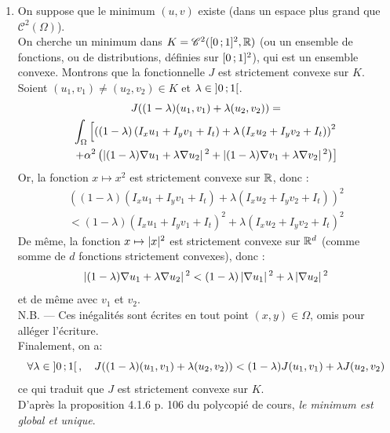 \begin{enumerate}[questions]
\item On suppose que le minimum $(u,v)$ existe (dans un espace plus grand que $\mathscr{C}^2(\Omega)$). \\
On cherche un minimum dans $K = \mathscr{C}^2(\interff{0}{1}^2, \reels)$ (ou un ensemble de fonctions, ou de distributions, définies sur $\interff{0}{1}^2$), qui est un ensemble convexe. Montrons que la fonctionnelle $J$ est strictement convexe sur $K$.\\
Soient $(u_1, v_1) \neq (u_2, v_2) \in K$ et $\lambda \in \interoo{0}{1}$.
\begin{multline*}
J((1-\lambda)(u_1, v_1) + \lambda(u_2, v_2)) = \\
\int_{\Omega} \left[ \left( \left(1-\lambda\right) \left( I_x u_1 + I_y v_1 + I_t \right) + \lambda \left( I_x u_2 + I_y v_2 + I_t \right) \right)^2 \right. \\
\left. + \alpha^2 \left( \abs{(1-\lambda)\nabla u_1 + \lambda \nabla u_2}^2 + \abs{(1-\lambda)\nabla v_1 + \lambda \nabla v_2}^2 \right) \right]
\end{multline*}
Or, la fonction $x \mapsto x^2$ est strictement convexe sur $\mathbb{R}$, donc :
\begin{multline*}
\left( \left(1-\lambda\right) \left( I_x u_1 + I_y v_1 + I_t \right) + \lambda \left( I_x u_2 + I_y v_2 + I_t \right) \right)^2 \\
< (1-\lambda)\left( I_x u_1 + I_y v_1 + I_t \right)^2 + \lambda \left( I_x u_2 + I_y v_2 + I_t \right)^2
\end{multline*}
De même, la fonction $x \mapsto \abs{x}^2$ est strictement convexe sur $\mathbb{R}^d$ (comme somme de $d$ fonctions strictement convexes), donc :
\[ \abs{(1-\lambda)\nabla u_1 + \lambda \nabla u_2}^2 < (1-\lambda)\abs{\nabla u_1}^2 + \lambda\abs{\nabla u_2}^2 \]
et de même avec $v_1$ et $v_2$.\\
N.B. --- Ces inégalités sont écrites en tout point $(x,y) \in \Omega$, omis pour alléger l'écriture.\\
Finalement, on a:
\[ \forall \lambda \in \interoo{0}{1}, \quad J((1-\lambda)(u_1, v_1) + \lambda(u_2, v_2)) < (1-\lambda)J(u_1, v_1) + \lambda J(u_2, v_2) \]
ce qui traduit que $J$ est strictement convexe sur $K$.\\
D'après la proposition 4.1.6 p. 106 du polycopié de cours, \emph{le minimum est global et unique}.



\end{enumerate}
